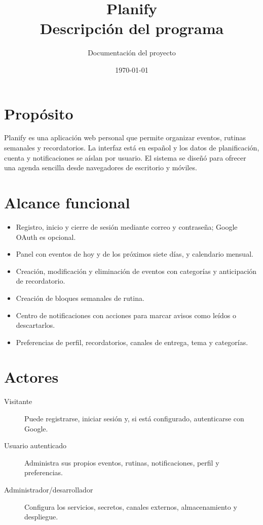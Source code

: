 \documentclass[12pt,a4paper]{article}
\title{Planify\\Descripción del programa}
\author{Documentación del proyecto}
\date{\today}
\begin{document}
\maketitle
\tableofcontents
\newpage

\section{Propósito}
Planify es una aplicación web personal que permite organizar eventos, rutinas semanales y recordatorios. La interfaz está en español y los datos de planificación, cuenta y notificaciones se aíslan por usuario. El sistema se diseñó para ofrecer una agenda sencilla desde navegadores de escritorio y móviles.

\section{Alcance funcional}
\begin{itemize}
  \item Registro, inicio y cierre de sesión mediante correo y contraseña; Google OAuth es opcional.
  \item Panel con eventos de hoy y de los próximos siete días, y calendario mensual.
  \item Creación, modificación y eliminación de eventos con categorías y anticipación de recordatorio.
  \item Creación de bloques semanales de rutina.
  \item Centro de notificaciones con acciones para marcar avisos como leídos o descartarlos.
  \item Preferencias de perfil, recordatorios, canales de entrega, tema y categorías.
\end{itemize}

\section{Actores}
\begin{description}
  \item[Visitante] Puede registrarse, iniciar sesión y, si está configurado, autenticarse con Google.
  \item[Usuario autenticado] Administra sus propios eventos, rutinas, notificaciones, perfil y preferencias.
  \item[Administrador/desarrollador] Configura los servicios, secretos, canales externos, almacenamiento y despliegue.
\end{description}
\end{document}
